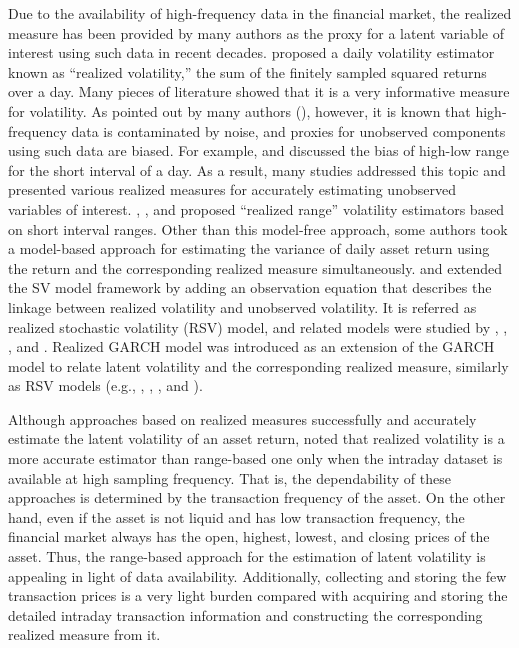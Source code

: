 \documentclass[11pt]{article}
\begin{document}
Due to the availability of high-frequency data in the financial market, the realized measure has been provided by many authors as the proxy for a latent variable of interest using such data in recent decades. 
\cite{AndersenBollerslev(1998)} proposed a daily volatility estimator known as ``realized volatility,'' the sum of the finitely sampled squared returns over a day. 
Many pieces of literature showed that it is a very informative measure for volatility. 
As pointed out by many authors (\cite{Bauwens_etal(2012)}), however, it is known that high-frequency data is contaminated by noise, and proxies for unobserved components using such data are biased. 
For example, \cite{MartensDijk(2007)} and \cite{ChristensenPodolskij(2007)} discussed the bias of high-low range for the short interval of a day. 
As a result, many studies addressed this topic and presented various realized measures for accurately estimating unobserved variables of interest. 
\cite{MartensDijk(2007)}, \cite{ChristensenPodolskij(2007)}, and \cite{Christensen_etal(2009)} proposed ``realized range'' volatility estimators based on short interval ranges. 
Other than this model-free approach, some authors took a model-based approach for estimating the variance of daily asset return using the return and the corresponding realized measure simultaneously. 
\cite{Takahashi_etal(2009)} and \cite{DobrevSzerszen(2010)} extended the SV model framework by adding an observation equation that describes the linkage between realized volatility and unobserved volatility. 
It is referred as realized stochastic volatility (RSV) model, and related models were studied by \cite{KoopmanScharth(2013)}, \cite{Shirota_etal(2014)}, \cite{ZhengSong(2014)}, and \cite{Takahashi_etal(2016)}. 
Realized GARCH model was introduced as an extension of the GARCH model to relate latent volatility and the corresponding realized measure, similarly as RSV models (e.g., \cite{Hansen_etal(2012)}, \cite{Watanabe(2012)}, \cite{Wang_etal(2019)}, and \cite{Chen_etal(2021)}). 

Although approaches based on realized measures successfully and accurately estimate the latent volatility of an asset return, 
\cite{DegiannakisLivada(2013)} noted that realized volatility is a more accurate estimator than range-based one only when the intraday dataset is available at high sampling frequency. 
That is, the dependability of these approaches is determined by the transaction frequency of the asset. 
On the other hand, even if the asset is not liquid and has low transaction frequency, the financial market always has the open, highest, lowest, and closing prices of the asset. 
Thus, the range-based approach for the estimation of latent volatility is appealing in light of data availability. 
Additionally, collecting and storing the few transaction prices is a very light burden compared with acquiring and storing the detailed intraday transaction information and constructing the corresponding realized measure from it. 
\end{document}
